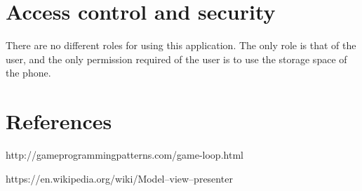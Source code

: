 \documentclass{article}
\begin{document}
\section{Access control and security}
There are no different roles for using this application. The only role is that of the user,
and the only permission required of the user is to use the storage space of the phone.

\section{References}
\begin{thebibliography}{9}
    
        http://gameprogrammingpatterns.com/game-loop.html
    
        https://en.wikipedia.org/wiki/Model–view–presenter

\end{thebibliography}
\end{document}
